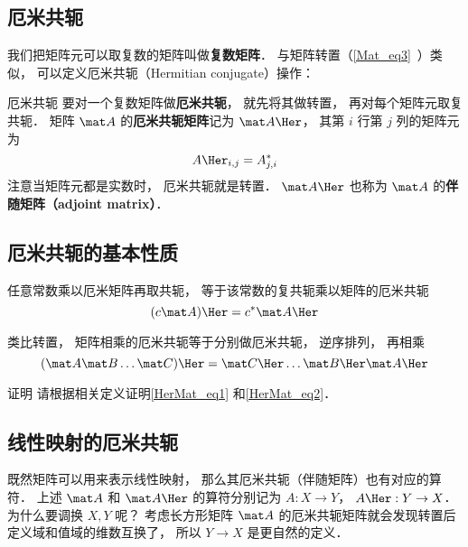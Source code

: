 

\subsection{厄米共轭}
我们把矩阵元可以取复数的矩阵叫做\textbf{复数矩阵}． %
与矩阵转置（\autoref{Mat_eq3}~）类似， 可以定义厄米共轭（Hermitian conjugate）操作：

\begin{definition}{厄米共轭}
要对一个复数矩阵做\textbf{厄米共轭}， 就先将其做转置， 再对每个矩阵元取复共轭． 矩阵 $\mat A$ 的\textbf{厄米共轭矩阵}记为 $\mat A\Her$， 其第 $i$ 行第 $j$ 列的矩阵元为
\begin{equation}
A\Her_{i,j} = A_{j,i}^*
\end{equation}
注意当矩阵元都是实数时， 厄米共轭就是转置． $\mat A\Her$ 也称为 $\mat A$ 的\textbf{伴随矩阵（adjoint matrix）}．
\end{definition}

\subsection{厄米共轭的基本性质}
任意常数乘以厄米矩阵再取共轭， 等于该常数的复共轭乘以矩阵的厄米共轭
\begin{equation}\label{HerMat_eq1}
(c \mat A)\Her = c^* \mat A\Her
\end{equation}

类比转置，%
矩阵相乘的厄米共轭等于分别做厄米共轭， 逆序排列， 再相乘
\begin{equation}\label{HerMat_eq2}
(\mat A \mat B \dots \mat C)\Her  = \mat C\Her \dots \mat B\Her \mat A\Her
\end{equation}

\begin{exercise}{证明}
请根据相关定义证明\autoref{HerMat_eq1} 和\autoref{HerMat_eq2}．
\end{exercise}

\subsection{线性映射的厄米共轭}
既然矩阵可以用来表示线性映射， 那么其厄米共轭（伴随矩阵）也有对应的算符． 上述 $\mat A$ 和 $\mat A\Her$ 的算符分别记为 $A:X\to Y$， $A\Her: Y\to X$． 为什么要调换 $X, Y$ 呢？ 考虑长方形矩阵 $\mat A$ 的厄米共轭矩阵就会发现转置后定义域和值域的维数互换了， 所以 $Y\to X$ 是更自然的定义．

